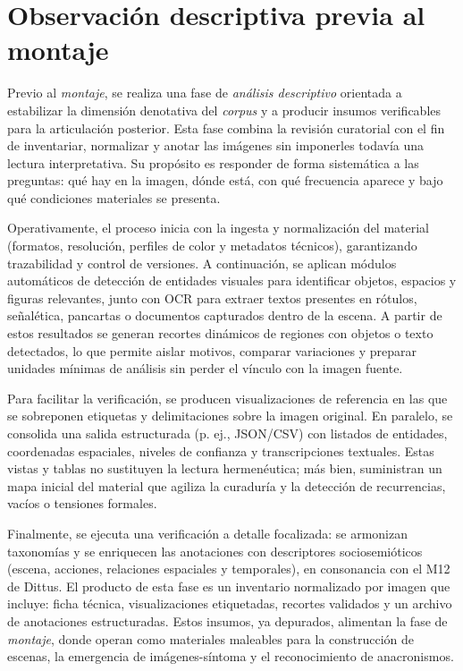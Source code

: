 \section{Observación descriptiva previa al montaje}

\textcolor{edit30sept}{Previo al \textit{montaje}, se realiza una fase de \textit{análisis descriptivo} orientada a estabilizar la dimensión denotativa del \textit{corpus} y a producir insumos verificables para la articulación posterior. Esta fase combina la revisión curatorial con el fin de inventariar, normalizar y anotar las imágenes sin imponerles todavía una lectura interpretativa. Su propósito es responder de forma sistemática a las preguntas: qué hay en la imagen, dónde está, con qué frecuencia aparece y bajo qué condiciones materiales se presenta.}

\textcolor{edit30sept}{Operativamente, el proceso inicia con la ingesta y normalización del material (formatos, resolución, perfiles de color y metadatos técnicos), garantizando trazabilidad y control de versiones. A continuación, se aplican módulos automáticos de detección de entidades visuales para identificar objetos, espacios y figuras relevantes, junto con OCR para extraer textos presentes en rótulos, señalética, pancartas o documentos capturados dentro de la escena. A partir de estos resultados se generan recortes dinámicos de regiones con objetos o texto detectados, lo que permite aislar motivos, comparar variaciones y preparar unidades mínimas de análisis sin perder el vínculo con la imagen fuente.}

\textcolor{edit30sept}{Para facilitar la verificación, se producen visualizaciones de referencia en las que se sobreponen etiquetas y delimitaciones sobre la imagen original. En paralelo, se consolida una salida estructurada (p. ej., JSON/CSV) con listados de entidades, coordenadas espaciales, niveles de confianza y transcripciones textuales. Estas vistas y tablas no sustituyen la lectura hermenéutica; más bien, suministran un mapa inicial del material que agiliza la curaduría y la detección de recurrencias, vacíos o tensiones formales.}

\textcolor{edit30sept}{Finalmente, se ejecuta una verificación a detalle focalizada: se armonizan taxonomías y se enriquecen las anotaciones con descriptores sociosemióticos (escena, acciones, relaciones espaciales y temporales), en consonancia con el M12 de Dittus. El producto de esta fase es un inventario normalizado por imagen que incluye: ficha técnica, visualizaciones etiquetadas, recortes validados y un archivo de anotaciones estructuradas. Estos insumos, ya depurados, alimentan la fase de \textit{montaje}, donde operan como materiales maleables para la construcción de escenas, la emergencia de imágenes-síntoma y el reconocimiento de anacronismos.}

